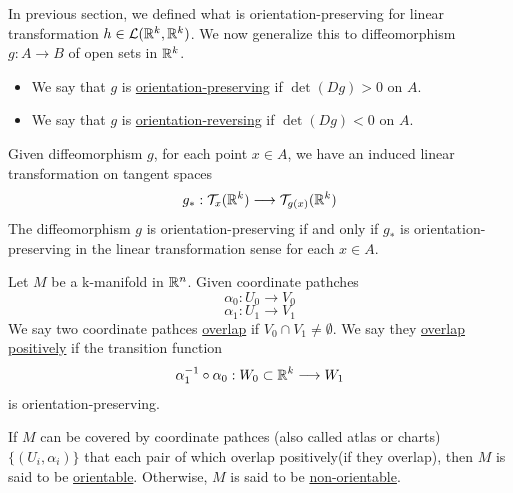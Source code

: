 \begin{definition}
    In previous section, we defined what is orientation-preserving for linear transformation $h\in \mathcal{L}(\mathbb{R}^k,\mathbb{R}^k)$. 
    We now generalize this to diffeomorphism $g:A\longrightarrow B$ of open sets in $\mathbb{R}^k$.
    \begin{itemize}
        \item We say that $g$ is \underline{orientation-preserving} if $\det(Dg)>0$ on $A$.
        \item We say that $g$ is \underline{orientation-reversing} if $\det(Dg)<0$ on $A$.
    \end{itemize}
\end{definition}

\begin{theorem*}
    Given diffeomorphism $g$, for each point $x\in A$, we have an induced linear transformation on tangent spaces $$g_*:\mathcal{T}_x(\mathbb{R}^k)\longrightarrow\mathcal{T}_{g(x)}(\mathbb{R}^k)$$
    The diffeomorphism $g$ is orientation-preserving if and only if $g_*$ is orientation-preserving in the linear transformation sense for each $x\in A$.
\end{theorem*}

\begin{definition}
    Let $M$ be a k-manifold in $\mathbb{R}^n$. Given coordinate pathches $$\alpha_0:U_0\longrightarrow V_0$$
    $$\alpha_1:U_1\longrightarrow V_1$$
    We say two coordinate pathces \underline{overlap} if $V_0\cap V_1\neq \emptyset$. 
    We say they \underline{overlap positively} if the transition function $$\alpha_1^{-1}\circ \alpha_0:W_0\subset \mathbb{R}^k\longrightarrow W_1$$
    is orientation-preserving.
\end{definition}

\begin{definition}
    If $M$ can be covered by coordinate pathces (also called atlas or charts) $\{(U_i,\alpha_i)\}$ that each pair of which overlap positively(if they overlap), then $M$ is said to be \underline{orientable}. 
    Otherwise, $M$ is said to be \underline{non-orientable}.
\end{definition}

